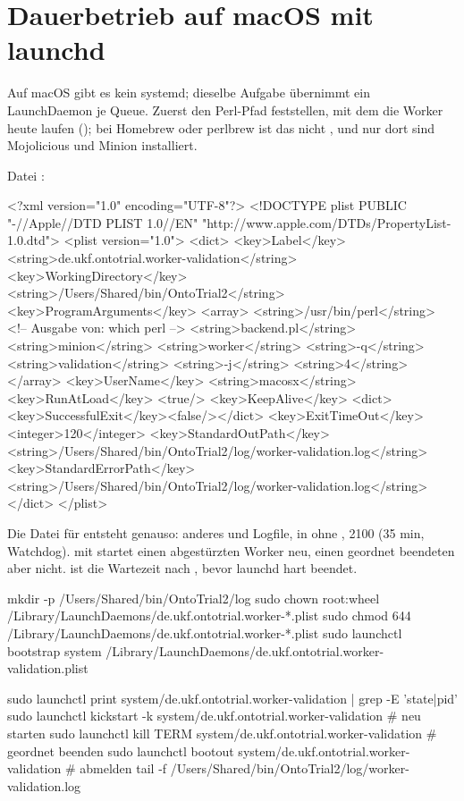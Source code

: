\documentclass[11pt,a4paper,parskip=half-,headings=standardclasses,toc=bibliography,open=any]{scrreprt}
\begin{document}
\section{Dauerbetrieb auf macOS mit launchd}\label{sec:launchd}

Auf macOS gibt es kein systemd; dieselbe Aufgabe übernimmt ein LaunchDaemon je Queue. Zuerst den Perl-Pfad feststellen, mit dem die Worker heute laufen (); bei Homebrew oder perlbrew ist das nicht , und nur dort sind Mojolicious und Minion installiert.

Datei :

\begin{befehl}
<?xml version="1.0" encoding="UTF-8"?>
<!DOCTYPE plist PUBLIC "-//Apple//DTD PLIST 1.0//EN"
  "http://www.apple.com/DTDs/PropertyList-1.0.dtd">
<plist version="1.0">
<dict>
  <key>Label</key>             <string>de.ukf.ontotrial.worker-validation</string>
  <key>WorkingDirectory</key>  <string>/Users/Shared/bin/OntoTrial2</string>
  <key>ProgramArguments</key>
  <array>
    <string>/usr/bin/perl</string>   <!-- Ausgabe von: which perl -->
    <string>backend.pl</string>
    <string>minion</string>
    <string>worker</string>
    <string>-q</string>
    <string>validation</string>
    <string>-j</string>
    <string>4</string>
  </array>
  <key>UserName</key>          <string>macosx</string>
  <key>RunAtLoad</key>         <true/>
  <key>KeepAlive</key>         <dict><key>SuccessfulExit</key><false/></dict>
  <key>ExitTimeOut</key>       <integer>120</integer>
  <key>StandardOutPath</key>   <string>/Users/Shared/bin/OntoTrial2/log/worker-validation.log</string>
  <key>StandardErrorPath</key> <string>/Users/Shared/bin/OntoTrial2/log/worker-validation.log</string>
</dict>
</plist>
\end{befehl}

Die Datei für  entsteht genauso: anderes  und Logfile, in  ohne ,  2100 (35 min, Watchdog).  mit  startet einen abgestürzten Worker neu, einen geordnet beendeten aber nicht.  ist die Wartezeit nach , bevor launchd hart beendet.

\begin{befehl}
mkdir -p /Users/Shared/bin/OntoTrial2/log
sudo chown root:wheel /Library/LaunchDaemons/de.ukf.ontotrial.worker-*.plist
sudo chmod 644 /Library/LaunchDaemons/de.ukf.ontotrial.worker-*.plist
sudo launchctl bootstrap system /Library/LaunchDaemons/de.ukf.ontotrial.worker-validation.plist

sudo launchctl print system/de.ukf.ontotrial.worker-validation | grep -E 'state|pid'
sudo launchctl kickstart -k system/de.ukf.ontotrial.worker-validation   # neu starten
sudo launchctl kill TERM system/de.ukf.ontotrial.worker-validation      # geordnet beenden
sudo launchctl bootout system/de.ukf.ontotrial.worker-validation        # abmelden
tail -f /Users/Shared/bin/OntoTrial2/log/worker-validation.log
\end{befehl}
\end{document}

